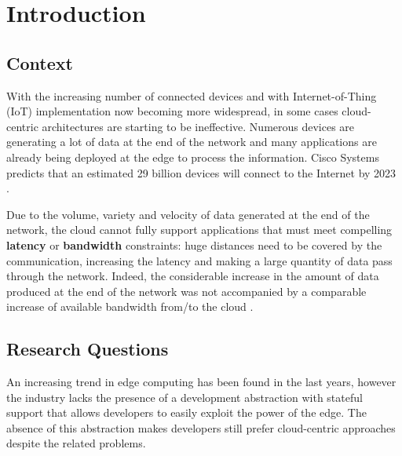 \chapter{Introduction}

\section{Context}


With the increasing number of connected devices and with Internet-of-Thing (IoT) implementation now becoming more widespread, in some cases cloud-centric architectures are starting to be ineffective. Numerous devices are generating a lot of data at the end of the network and many applications are already being deployed at the edge to process the information.
Cisco Systems predicts that an estimated 29 billion devices will connect to the Internet by 2023 \cite{cisco2018-2023}.

Due to the volume, variety and velocity of data generated at the end of the network, the cloud cannot fully support applications that must meet compelling \textbf{latency} or \textbf{bandwidth} constraints: huge distances need to be covered by the communication, increasing the latency and making a large quantity of data pass through the network.
Indeed, the considerable increase in the amount of data produced at the end of the network was not accompanied by a comparable increase of available bandwidth from/to the cloud \cite{promise-of-edge-computing}.



\section{Research Questions}
An increasing trend in edge computing has been found in the last years, however the industry lacks the presence of a development abstraction with stateful support that allows developers to easily exploit the power of the edge. The absence of this abstraction makes developers still prefer cloud-centric approaches despite the related problems.

